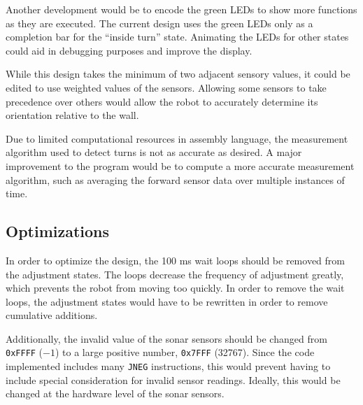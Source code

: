 Another development would be to encode the green LEDs to show more
functions as they are executed. The current design uses the green LEDs
only as a completion bar for the ``inside turn'' state. Animating the LEDs
for other states could aid in debugging purposes and improve the
display. 

While this design takes the minimum of two adjacent sensory values, it
could be edited to use weighted values of the sensors. Allowing some
sensors to take precedence over others would allow the robot to
accurately determine its orientation relative to the wall. 

Due to limited computational resources in assembly language, the
measurement algorithm used to detect turns is not as accurate as
desired. A major improvement to the program would be to compute a more
accurate measurement algorithm, such as averaging the forward sensor
data over multiple instances of time.

\subsection{Optimizations}

In order to optimize the design, the 100 ms wait loops should be removed
from the adjustment states. The loops decrease the frequency of adjustment
greatly, which prevents the robot from moving too quickly. In order to
remove the wait loops, the adjustment states would have to be
rewritten in order to remove cumulative additions. 

Additionally, the invalid value of the sonar sensors should be changed
from \verb+0xFFFF+ (\(-1\)) to a large positive number,
\verb+0x7FFF+ (32767). Since the code implemented includes many \verb+JNEG+
instructions, this would prevent having to include special
consideration for invalid sensor readings. Ideally, this would be
changed at the hardware level of the sonar sensors. 